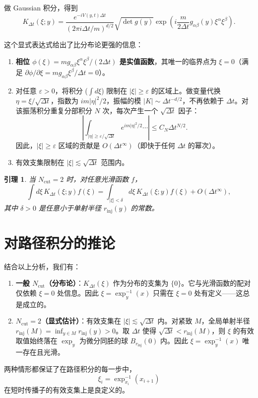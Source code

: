 \documentclass{book}
\newtheorem{lemma}{引理}[chapter]
\begin{document}
做 Gaussian 积分，得到
\begin{equation}
  K_{\Delta t}(\xi; y) = \frac{e^{-i V(y,t) \Delta t}}{(2\pi i \Delta t / m)^{d/2}} \sqrt{\det g(y)} \exp\left( i \frac{m}{2\Delta t} g_{\alpha\beta}(y) \xi^\alpha \xi^\beta \right). \label{eq:K-explicit}
\end{equation}

这个显式表达式给出了比分布论更强的信息：

\begin{enumerate}
  \item \textbf{相位 $\phi(\xi) = m g_{\alpha\beta} \xi^\alpha \xi^\beta / (2\Delta t)$ 是实值函数}，其唯一的临界点为 $\xi=0$（满足 $\partial\phi/\partial\xi = m g_{\alpha\beta} \xi^\beta / \Delta t = 0$）。
  
  \item 对任意 $\varepsilon > 0$，将积分 ($\int d\xi$) 限制在 $|\xi| \ge \varepsilon$ 的区域上。做变量代换 $\eta = \xi / \sqrt{\Delta t}$，指数为 $i m |\eta|^2/2$，振幅的模 $|K| \sim \Delta t^{-d/2}$，不再依赖于 $\Delta t$。对该振荡积分重复分部积分 $N$ 次，每次产生一个 $\sqrt{\Delta t}$ 因子：
    \[
    \left| \int_{|\eta| \ge \varepsilon/\sqrt{\Delta t}} e^{i m |\eta|^2/2} \cdots \right| \le C_N \Delta t^{N/2}.
    \]
    因此，$|\xi| \ge \varepsilon$ 区域的贡献是 $O(\Delta t^\infty)$（即快于任何 $\Delta t$ 的幂次）。
  
  \item 有效支集限制在 $|\xi| \lesssim \sqrt{\Delta t}$ 范围内。
\end{enumerate}

\begin{lemma}
  当 $N_{\mathrm{cut}} = 2$ 时，对任意光滑函数 $f$，
  \[
  \int d\xi \, K_{\Delta t}(\xi; y) f(\xi) = \int_{|\xi| < \delta} d\xi \, K_{\Delta t}(\xi; y) f(\xi) + O(\Delta t^\infty),
  \]
  其中 $\delta > 0$ 是任意小于单射半径 $r_{\mathrm{inj}}(y)$ 的常数。
\end{lemma}

\section{对路径积分的推论}

结合以上分析，我们有：

\begin{enumerate}
  \item \textbf{一般 $N_{\mathrm{cut}}$（分布论）}：$K_{\Delta t}(\xi)$ 作为分布的支集为 $\{0\}$。它与光滑函数的配对仅依赖 $\xi=0$ 处信息。因此 $\xi = \exp_y^{-1}(x)$ 只需在 $\xi=0$ 处有定义——这总是成立的。
  
  \item \textbf{$N_{\mathrm{cut}}=2$（显式估计）}：有效支集在 $|\xi| \lesssim \sqrt{\Delta t}$ 内。对紧致 $M$，全局单射半径 $r_{\mathrm{inj}}(M) = \inf_{y\in M} r_{\mathrm{inj}}(y) > 0$。取 $\Delta t$ 使得 $\sqrt{\Delta t} < r_{\mathrm{inj}}(M)$，则 $\xi$ 的有效取值始终落在 $\exp_y$ 为微分同胚的球 $B_{r_{\mathrm{inj}}}(0)$ 内。因此 $\xi = \exp_y^{-1}(x)$ 唯一存在且光滑。
\end{enumerate}

两种情形都保证了在路径积分的每一步中，
\[
\xi_i = \exp_{x_i}^{-1}(x_{i+1})
\]
在短时传播子的有效支集上是良定义的。
\end{document}
